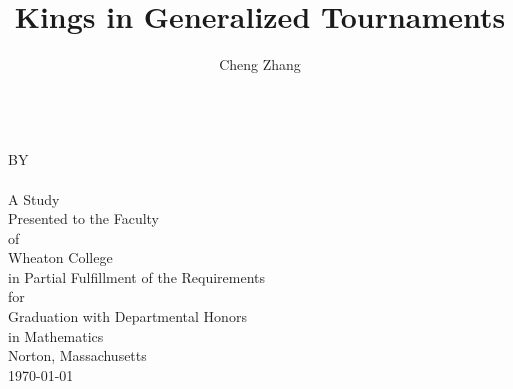 \documentclass[12pt, oneside]{book}
\title{Kings in Generalized Tournaments}
\author{Cheng Zhang}
\begin{document}
  \begin{titlepage}
    \thispagestyle{empty}
    \doublespacing\centering

    \vfill
    \LARGE \textbf{\thetitle{}} \\
    \large BY \\
    \textbf{\theauthor{}} \\

    \vfill
    A Study \\
    Presented to the Faculty \\
    of \\
    Wheaton College \\
    in Partial Fulfillment of the Requirements \\
    for \\
    Graduation with Departmental Honors \\
    in Mathematics \\
    Norton, Massachusetts \\
    \monthyeardate\today

    \vfill
  \end{titlepage}

  \tableofcontents

  
  
  
  
  
  
  
  



  \listoffigures
  \printbibliography[heading=bibintoc]
  \cleardoublepage{}
  \printindex
\end{document}
